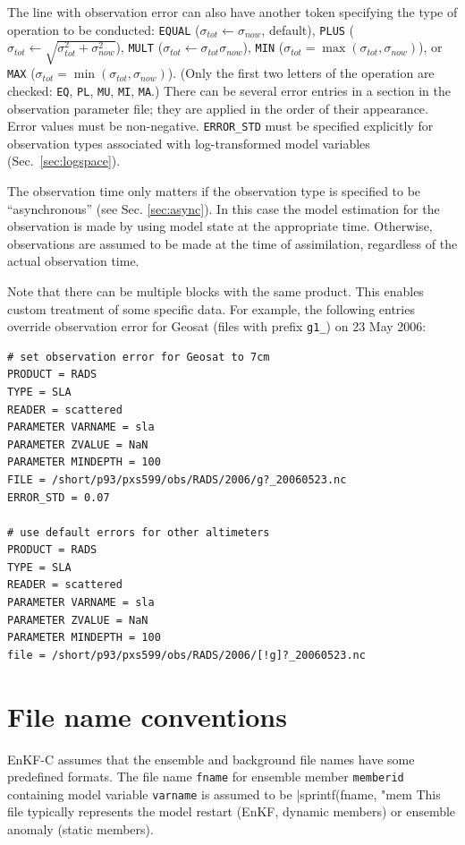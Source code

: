 \documentclass[11pt]{report}
\begin{document}
The line with observation error can also have another token specifying the type of operation to be conducted: \verb|EQUAL| ($\sigma_{tot} \leftarrow \sigma_{now}$, default), \verb|PLUS| ($\sigma_{tot} \leftarrow \sqrt{\sigma_{tot}^2 + \sigma_{now}^2}$), \verb|MULT| ($\sigma_{tot} \leftarrow \sigma_{tot} \sigma_{now}$), \verb|MIN| ($\sigma_{tot} = \max(\sigma_{tot}, \sigma_{now})$), or \verb|MAX| ($\sigma_{tot} = \min(\sigma_{tot}, \sigma_{now})$).
(Only the first two letters of the operation are checked: \verb|EQ|, \verb|PL|, \verb|MU|, \verb|MI|, \verb|MA|.)
There can be several error entries in a section in the observation parameter file; they are applied in the order of their appearance.
Error values must be non-negative.
\verb|ERROR_STD| must be specified explicitly for observation types associated with log-transformed model variables (Sec.~\ref{sec:logspace}).

The observation time only matters if the observation type is specified to be ``asynchronous'' (see Sec. \ref{sec:async}).
In this case the model estimation for the observation is made by using model state at the appropriate time.
Otherwise, observations are assumed to be made at the time of assimilation, regardless of the actual observation time.

Note that there can be multiple blocks with the same product.
This enables custom treatment of some specific data.
For example, the following entries override observation error for Geosat (files with prefix \verb|g1_|) on 23 May 2006:
\begin{Verbatim}[frame=single,fontsize=\footnotesize]
# set observation error for Geosat to 7cm
PRODUCT = RADS
TYPE = SLA
READER = scattered
PARAMETER VARNAME = sla
PARAMETER ZVALUE = NaN
PARAMETER MINDEPTH = 100
FILE = /short/p93/pxs599/obs/RADS/2006/g?_20060523.nc
ERROR_STD = 0.07

# use default errors for other altimeters
PRODUCT = RADS
TYPE = SLA
READER = scattered
PARAMETER VARNAME = sla
PARAMETER ZVALUE = NaN
PARAMETER MINDEPTH = 100
file = /short/p93/pxs599/obs/RADS/2006/[!g]?_20060523.nc
\end{Verbatim}

\section{File name conventions}
\label{sec:filenames}

EnKF-C assumes that the ensemble and background file names have some predefined formats.
The file name \verb|fname| for ensemble member \verb|memberid| containing model variable \verb|varname| is assumed to be \spverb|sprintf(fname, "mem%
This file typically represents the model restart (EnKF, dynamic members) or ensemble anomaly (static members).
\end{document}
